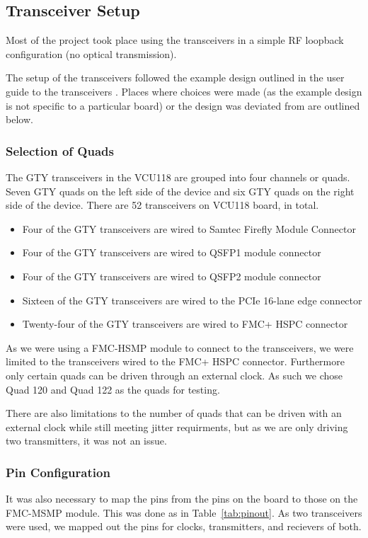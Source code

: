 \begin{figure}[ht]
\end{figure}

\subsection{Transceiver Setup}%
\label{sub:transceiver_setup}
Most of the project took place using the transceivers in a simple RF loopback
configuration (no optical transmission).

The setup of the transceivers followed the example design outlined in the user
guide to the transceivers \cite{wizard_guide}. Places where choices were made
(as the example design is not specific to a particular board) or the
design was deviated from are outlined below. 

\subsubsection{Selection of Quads}%
\label{ssub:selection_of_quads}
The GTY transceivers in the VCU118 are grouped into four channels or quads.
Seven GTY quads on the left side of the device and six GTY quads on the right
side of the device.
There are 52 transceivers on VCU118 board, in total.
\begin{itemize}
    \item Four of the GTY transceivers are wired to Samtec Firefly Module Connector 
    \item Four of the GTY transceivers are wired to QSFP1 module connector 
    \item Four of the GTY transceivers are wired to QSFP2 module connector 
    \item Sixteen of the GTY transceivers are wired to the PCIe 16-lane edge connector
    \item Twenty-four of the GTY transceivers are wired to FMC+ HSPC connector
\end{itemize}

As we were using a FMC-HSMP module to connect to the transceivers, we were limited to the transceivers wired
to the FMC+ HSPC connector.
Furthermore only certain quads can be driven through an external clock.
As such we chose Quad 120 and Quad 122 as the quads for testing.

There are also limitations to the number of quads that can be driven with an
external clock while still meeting jitter requirments, but as we are only
driving two transmitters, it was not an issue.



\subsubsection{Pin Configuration}%
\label{ssub:pin_configuration}
It was also necessary to map the pins from the pins on the board to those on
the FMC-MSMP module. This was done as in Table~\ref{tab:pinout}.
As two transceivers were used, we mapped out the pins for clocks, transmitters,
and recievers of both.

